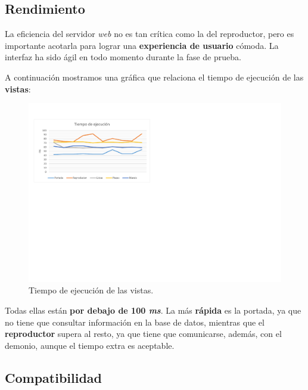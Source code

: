 \subsection{Rendimiento}

La eficiencia del servidor \textit{web} no es tan crítica como la del reproductor, pero es importante acotarla para lograr una \textbf{experiencia de usuario} cómoda. La interfaz ha sido ágil en todo momento durante la fase de prueba. 

A continuación mostramos una gráfica que relaciona el tiempo de ejecución de las \textbf{vistas}:

\smallskip

\begin{figure}[H]
	\noindent \begin{centering}
		\includegraphics[width=\linewidth*3/4]{capitulo6/ejecucion_web}
		\par\end{centering}
	\smallskip
	\caption{\label{fig:ejecucion_web} Tiempo de ejecución de las vistas.}
\end{figure} 

\smallskip

Todas ellas están \textbf{por debajo de 100 \textit{ms}}. La más \textbf{rápida} es la portada, ya que no tiene que consultar información en la base de datos, mientras que el \textbf{reproductor} supera al resto, ya que tiene que comunicarse, además, con el demonio, aunque el tiempo extra es aceptable.

\subsection{Compatibilidad}

